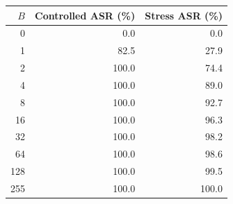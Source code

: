 \begin{tabular}{rrr}
\toprule
$B$ & \textbf{Controlled ASR (\%)} & \textbf{Stress ASR (\%)} \\
\midrule
0 & 0.0 & 0.0 \\
1 & 82.5 & 27.9 \\
2 & 100.0 & 74.4 \\
4 & 100.0 & 89.0 \\
8 & 100.0 & 92.7 \\
16 & 100.0 & 96.3 \\
32 & 100.0 & 98.2 \\
64 & 100.0 & 98.6 \\
128 & 100.0 & 99.5 \\
255 & 100.0 & 100.0 \\
\bottomrule
\end{tabular}
